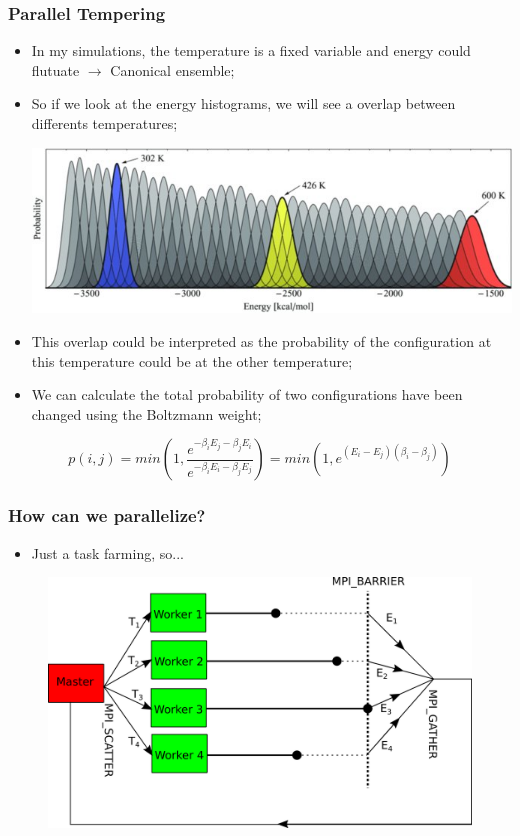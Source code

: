 \documentclass{beamer}
\begin{document}
\begin{frame}
  \frametitle{Parallel Tempering}
  \begin{itemize}
  \item In my simulations, the temperature is a fixed variable and energy could flutuate $\rightarrow$ Canonical ensemble;
  \item So if we look at the energy histograms, we will see a overlap between differents temperatures;
    \begin{center}
      \includegraphics[scale=0.3]{Imagens/histos.jpg}
    \end{center}
  \item This overlap could be interpreted as the probability of the configuration at this temperature could be at the other temperature;
  \item We can calculate the total probability of two configurations have been changed using the Boltzmann weight;
  \end{itemize}

  $$ p(i,j)=min\left(1,\dfrac{e^{-\beta_i E_j-\beta_j E_i}}{e^{-\beta_i E_i-\beta_j E_j}}\right)=min\left(1,e^{(E_i-E_j)(\beta_i-\beta_j)}\right) $$
\end{frame}

\begin{frame}
  \frametitle{How can we parallelize?}

  \begin{itemize}
  \item Just a task farming, so...
  \end{itemize}

  \begin{figure}[h!]
    \centering
    \includegraphics[scale=0.6]{Imagens/taskFarm.png}
  \end{figure}
\end{frame}
\end{document}
